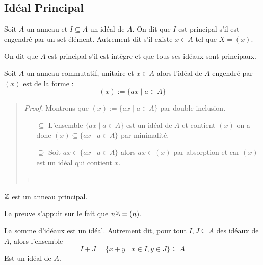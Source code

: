 \subsection{Idéal Principal}

\begin{definition}
    Soit $A$ un anneau et $I \subseteq A$ un idéal de $A$. On dit que $I$ est principal s'il est engendré par un set élément. 
    Autrement dit s'il existe $x \in A$ tel que $X = (x)$. 

    On dit que $A$ est principal s'il est intègre et que tous ses idéaux sont principaux. 
\end{definition}

\begin{proposition}
    Soit $A$ un anneau commutatif, unitaire et $x \in A$ alors l'idéal de $A$ engendré par $(x)$ est de la forme : 
        \[ (x) := \{ ax \; | \; a \in A \}  \] 
\end{proposition}

\begin{quote}
\begin{footnotesize}
    \begin{proof}
        Montrons que $ (x) := \{ ax \; | \; a \in A \} $ par double inclusion. 
        \begin{itemize}
            \item[$\boxed{\subseteq}$] L'ensemble $\{ ax \; | \; a \in A \} $ est un idéal de $A$ et contient $(x)$ on a donc 
            $(x) \subseteq \{ ax \; | \; a \in A \}$ par minimalité. 
            \item[$\boxed{\supseteq}$] Soit $ax \in \{ ax \; | \; a \in A \} $ alors $ax \in (x)$ par absorption et 
            car $(x)$ est un idéal qui contient $x$. 
        \end{itemize}
    \end{proof}
\end{footnotesize}
\end{quote}

\begin{theorem}
    $\mathbb{Z}$ est un anneau principal. 
\end{theorem}

La preuve s'appuit sur le fait que $n\mathbb{Z} = (n)$. 

\begin{definition}
    La somme d'idéaux est un idéal. Autrement dit, pour tout $I,J \subseteq A$ des idéaux de $A$, alors l'ensemble 
        \[ I + J = \{ x + y \; | \; x \in I, y \in J \} \subseteq A \]
    Est un idéal de $A$.  
\end{definition}

